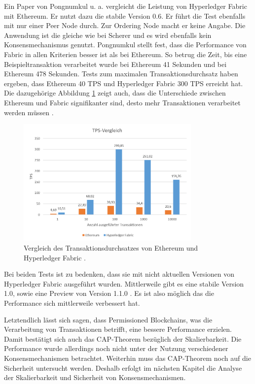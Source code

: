 Ein Paper von Pongnumkul u. a. vergleicht die Leistung von Hyperledger Fabric mit Ethereum. Er nutzt dazu die stabile Version 0.6. Er führt die Test ebenfalls mit nur einer Peer Node durch. Zur Ordering Node macht er keine Angabe. Die Anwendung ist die gleiche wie bei Scherer und es wird ebenfalls kein Konsensmechanismus genutzt. Pongnumkul stellt fest, dass die Performance von Fabric in allen Kriterien besser ist als bei Ethereum. So betrug die Zeit, bis eine Beispieltransaktion verarbeitet wurde bei Ethereum 41 Sekunden und bei Ethereum 478 Sekunden. Tests zum maximalen Transaktionsdurchsatz haben ergeben, dass Ethereum 40 TPS und Hyperledger Fabric 300 TPS erreicht hat. Die dazugehörige Abbildung \ref{fig:tps-ethereum-vs-hyperledger} zeigt auch, dass die Unterschiede zwischen Ethereum und Fabric signifikanter sind, desto mehr Transaktionen verarbeitet werden müssen \cite{PongnumkulPerformanceAnalysisPrivate2017}.

\begin{figure}[!htbp]
  \centering
    \includegraphics[width=0.8\textwidth,angle=0]{images/tps-ethvshyp}
     \caption{Vergleich des Transaktionsdurchsatzes von Ethereum und Hyperledger Fabric \cite{PongnumkulPerformanceAnalysisPrivate2017}.}
    \label{fig:tps-ethereum-vs-hyperledger}
\end{figure} 

Bei beiden Tests ist zu bedenken, dass sie mit nicht aktuellen Versionen von Hyperledger Fabric ausgeführt wurden. Mittlerweile gibt es eine stabile Version 1.0, sowie eine Preview von Version 1.1.0 \cite{HyperledgerFabricTeamHyperledgerFabricReleases2018}. Es ist also möglich das die Performance sich mittlerweile verbessert hat.

Letztendlich lässt sich sagen, dass Permissioned Blockchains, was die Verarbeitung von Transaktionen betrifft, eine bessere Performance erzielen. Damit bestätigt sich auch das CAP-Theorem bezüglich der Skalierbarkeit. Die Performance wurde allerdings noch nicht unter der Nutzung verschiedener Konsensmechanismen betrachtet. Weiterhin muss das CAP-Theorem noch auf die Sicherheit untersucht werden. Deshalb erfolgt im nächsten Kapitel die Analyse der Skalierbarkeit und Sicherheit von Konsensmechanismen.

